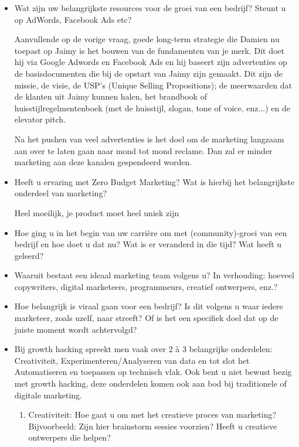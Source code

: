 \begin{itemize}
	\item Wat zijn uw belangrijkste resources voor de groei van een bedrijf? Steunt u op AdWords, Facebook Ads etc?
	
Aanvullende op de vorige vraag, goede long-term strategie die Damien nu toepast op Jaimy is het bouwen van de fundamenten van je merk. Dit doet hij via Google Adwords en Facebook Ads en hij baseert zijn advertenties op de basisdocumenten die bij de opstart van Jaimy zijn gemaakt. Dit zijn de missie, de visie, de USP's (Unique Selling Propositions); de meerwaarden dat de klanten uit Jaimy kunnen halen, het brandbook of huisstijlregelmentenboek (met de huisstijl, slogan, tone of voice, enz...) en de elevator pitch. 

Na het pushen van veel advertenties is het doel om de marketing langzaam aan over te laten gaan naar mond tot mond reclame. Dan zal er minder marketing aan deze kanalen gespendeerd worden. 

	\item Heeft u ervaring met Zero Budget Marketing? Wat is hierbij het belangrijkste onderdeel van marketing?
	
Heel moeilijk, je product moet heel uniek zijn
	
	\item Hoe ging u in het begin van uw carrière om met (community)-groei van een bedrijf en hoe doet u dat nu? Wat is er veranderd in die tijd? Wat heeft u geleerd?
	

	
	\item Waaruit bestaat een ideaal marketing team volgens u? In verhouding: hoeveel copywriters, digital marketeers, programmeurs, creatief ontwerpers, enz.?
	
	
	
	\item Hoe belangrijk is viraal gaan voor een bedrijf? Is dit volgens u waar iedere marketeer, zoals uzelf, naar streeft? Of is het een specifiek doel dat op de juiste moment wordt achtervolgd?
	
	
	
	\item Bij growth hacking spreekt men vaak over 2 à 3 belangrijke onderdelen: Creativiteit, Experimenteren/Analyseren van data en tot slot het Automatiseren en toepassen op technisch vlak. Ook bent u niet bewust bezig met growth hacking, deze onderdelen komen ook aan bod bij traditionele of digitale marketing.
	\begin{enumerate}[label*=\arabic*.]
		\item Creativiteit: Hoe gaat u om met het creatieve proces van marketing? Bijvoorbeeld: Zijn hier brainstorm sessies voorzien? Heeft u creatieve ontwerpers die helpen?
		

\end{enumerate}
\end{itemize}
